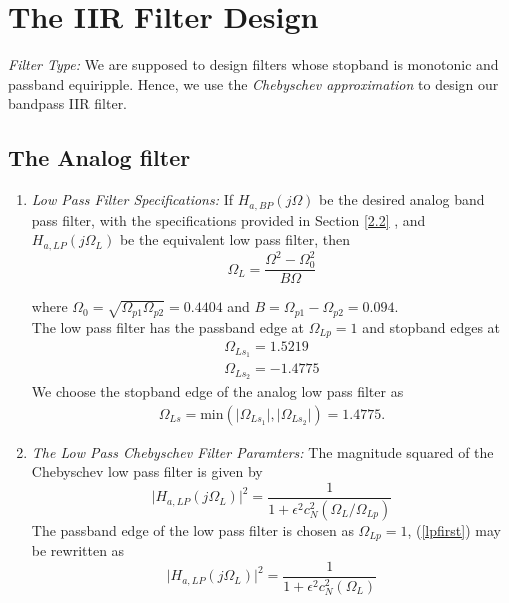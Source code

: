 \documentclass{article}
\begin{document}
\section{\textbf{The IIR Filter Design}}
{\em Filter Type:}  We are supposed to design filters whose stopband is monotonic and passband equiripple.  
Hence, we use the {\em Chebyschev approximation} to design our bandpass IIR filter.

\subsection{\textbf{The Analog filter}} 
\begin{enumerate}

\item {\em Low Pass Filter Specifications:}  If $H_{a, BP}(j\Omega)$ be the desired analog band
pass filter,  with the specifications provided in Section \ref{2.2} , and $H_{a,LP}(j\Omega_L)$ 
be the equivalent low pass filter, then
\begin{equation}
\label{transition}
\Omega_L = \frac{\Omega^2 - \Omega_0^2}{B\Omega}
\end{equation}

where $\Omega_0 = \sqrt{\Omega_{p1}\Omega_{p2}} = 0.4404$ and $B = \Omega_{p1} - \Omega_{p2} = 0.094$. \\
 The low pass filter has the passband edge at $\Omega_{Lp} = 1$ and stopband edges at 
 \begin{align}
 \Omega_{Ls_1} = 1.5219 \\
 \Omega_{Ls_2} = -1.4775
 \end{align} 
 We choose the stopband edge of the analog low pass filter as 
 \begin{align}
 \Omega_{Ls} = \mbox{min}(\vert \Omega_{Ls_1}\vert,\vert \Omega_{Ls_2}\vert) = 1.4775.
 \end{align}

\item {\em The Low Pass Chebyschev Filter Paramters:}  The magnitude squared of the Chebyschev low pass filter is given by 
\begin{equation}
\label{lpfirst}
\vert H_{a,LP}(j\Omega_L)\vert^2 = \frac{1}{1 + \epsilon^2c_N^2(\Omega_L/\Omega_{Lp})}
\end{equation}
The passband edge of the low pass filter is chosen as $\Omega_{Lp} = 1$, (\ref{lpfirst}) may be rewritten as
\begin{equation}
\label{lpsecond}
\vert H_{a,LP}(j\Omega_L)\vert^2 = \frac{1}{1 + \epsilon^2c_N^2(\Omega_L)}
\end{equation}


\end{enumerate}
\end{document}
